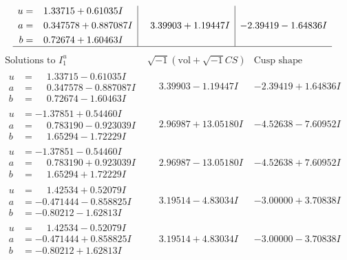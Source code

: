 \documentclass[1p]{elsarticle_modified}
\theoremstyle{definition}
\newcommand{\I}{\sqrt{-1}}
\begin{document}
$$\begin{array}{c|c|c}
\begin{aligned}
u &= \phantom{-}1.33715 + 0.61035 I \\
a &= \phantom{-}0.347578 + 0.887087 I \\
b &= \phantom{-}0.72674 + 1.60463 I\end{aligned}
 & \phantom{-}3.39903 + 1.19447 I & -2.39419 - 1.64836 I\\
 \hline 
 \end{array}$$\newpage$$\begin{array}{c|c|c}  
\text{Solutions to }I^u_{1}& \I (\text{vol} + \sqrt{-1}CS) & \text{Cusp shape}\\
 \hline 
\begin{aligned}
u &= \phantom{-}1.33715 - 0.61035 I \\
a &= \phantom{-}0.347578 - 0.887087 I \\
b &= \phantom{-}0.72674 - 1.60463 I\end{aligned}
 & \phantom{-}3.39903 - 1.19447 I & -2.39419 + 1.64836 I \\ \hline\begin{aligned}
u &= -1.37851 + 0.54460 I \\
a &= \phantom{-}0.783190 - 0.923039 I \\
b &= \phantom{-}1.65294 - 1.72229 I\end{aligned}
 & \phantom{-}2.96987 + 13.05180 I & -4.52638 - 7.60952 I \\ \hline\begin{aligned}
u &= -1.37851 - 0.54460 I \\
a &= \phantom{-}0.783190 + 0.923039 I \\
b &= \phantom{-}1.65294 + 1.72229 I\end{aligned}
 & \phantom{-}2.96987 - 13.05180 I & -4.52638 + 7.60952 I \\ \hline\begin{aligned}
u &= \phantom{-}1.42534 + 0.52079 I \\
a &= -0.471444 - 0.858825 I \\
b &= -0.80212 - 1.62813 I\end{aligned}
 & \phantom{-}3.19514 - 4.83034 I & -3.00000 + 3.70838 I \\ \hline\begin{aligned}
u &= \phantom{-}1.42534 - 0.52079 I \\
a &= -0.471444 + 0.858825 I \\
b &= -0.80212 + 1.62813 I\end{aligned}
 & \phantom{-}3.19514 + 4.83034 I & -3.00000 - 3.70838 I \\ \hline\begin{aligned}

\end{aligned}
\end{array}$$
\end{document}
